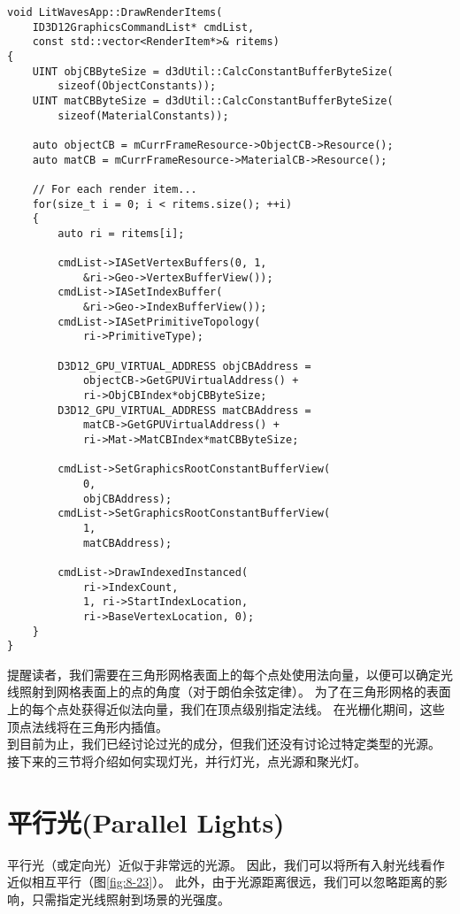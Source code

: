 \begin{lstlisting}
void LitWavesApp::DrawRenderItems(
    ID3D12GraphicsCommandList* cmdList, 
    const std::vector<RenderItem*>& ritems)
{
    UINT objCBByteSize = d3dUtil::CalcConstantBufferByteSize(
        sizeof(ObjectConstants));
    UINT matCBByteSize = d3dUtil::CalcConstantBufferByteSize(
        sizeof(MaterialConstants));

    auto objectCB = mCurrFrameResource->ObjectCB->Resource();
    auto matCB = mCurrFrameResource->MaterialCB->Resource();

    // For each render item...
    for(size_t i = 0; i < ritems.size(); ++i)
    {
        auto ri = ritems[i];

        cmdList->IASetVertexBuffers(0, 1, 
            &ri->Geo->VertexBufferView());
        cmdList->IASetIndexBuffer(
            &ri->Geo->IndexBufferView());
        cmdList->IASetPrimitiveTopology(
            ri->PrimitiveType);

        D3D12_GPU_VIRTUAL_ADDRESS objCBAddress = 
            objectCB->GetGPUVirtualAddress() + 
            ri->ObjCBIndex*objCBByteSize;
        D3D12_GPU_VIRTUAL_ADDRESS matCBAddress = 
            matCB->GetGPUVirtualAddress() + 
            ri->Mat->MatCBIndex*matCBByteSize;

        cmdList->SetGraphicsRootConstantBufferView(
            0, 
            objCBAddress);
        cmdList->SetGraphicsRootConstantBufferView(
            1, 
            matCBAddress);

        cmdList->DrawIndexedInstanced(
            ri->IndexCount, 
            1, ri->StartIndexLocation, 
            ri->BaseVertexLocation, 0);
    }
}
\end{lstlisting}

\begin{flushleft}
提醒读者，我们需要在三角形网格表面上的每个点处使用法向量，以便可以确定光线照射到网格表面上的点的角度（对于朗伯余弦定律）。 为了在三角形网格的表面上的每个点处获得近似法向量，我们在顶点级别指定法线。 在光栅化期间，这些顶点法线将在三角形内插值。\\
到目前为止，我们已经讨论过光的成分，但我们还没有讨论过特定类型的光源。 接下来的三节将介绍如何实现灯光，并行灯光，点光源和聚光灯。\\
\end{flushleft}

\section{平行光(Parallel Lights)}
\begin{flushleft}
平行光（或定向光）近似于非常远的光源。 因此，我们可以将所有入射光线看作近似相互平行（图\ref{fig:8-23}）。 此外，由于光源距离很远，我们可以忽略距离的影响，只需指定光线照射到场景的光强度。
\end{flushleft}

